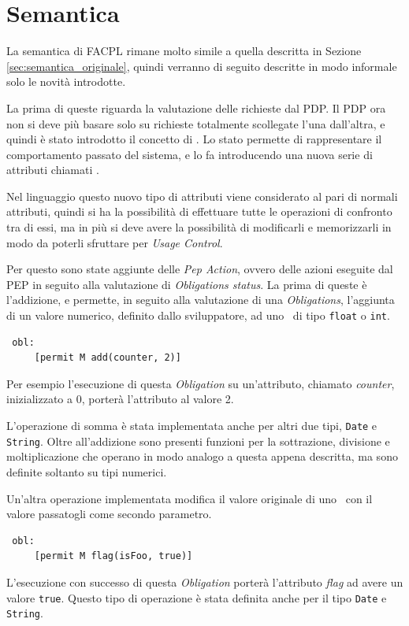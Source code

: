 
\section{Semantica} %
\label{sec:semantica}
La semantica di FACPL rimane molto simile a quella descritta in Sezione \ref{sec:semantica_originale}, quindi verranno di seguito descritte in modo informale solo le novità introdotte.\\ \par
La prima di queste riguarda la valutazione delle richieste dal PDP. Il PDP ora non si deve più basare solo su richieste totalmente scollegate l'una dall'altra, e quindi è stato introdotto il concetto di \status.
Lo stato permette di rappresentare il comportamento passato del sistema, e lo fa introducendo una nuova serie di attributi chiamati \statusattribute.\\ \par
Nel linguaggio questo nuovo tipo di attributi viene considerato al pari di normali attributi, quindi si ha la possibilità di effettuare tutte le operazioni di confronto tra di essi, ma in più si deve avere la possibilità di modificarli e memorizzarli in modo da poterli sfruttare per \textit{Usage Control}.\\ \par

Per questo sono state aggiunte delle \textit{Pep Action}, ovvero delle azioni eseguite dal PEP in seguito alla valutazione di \textit{Obligations status}. La prima di queste è l'addizione, 
 e permette, in seguito alla valutazione di una \textit{Obligations}, l'aggiunta di un valore numerico, definito dallo sviluppatore, ad uno \statusattribute \ di tipo \texttt{float} o \texttt{int}. 
\begin{verbatim}
 obl:
     [permit M add(counter, 2)]
\end{verbatim}
Per esempio l'esecuzione di questa \textit{Obligation} su un'attributo, chiamato \textit{counter}, inizializzato a $0$, porterà l'attributo al 
valore 2. 

L'operazione di somma è stata implementata anche per altri due tipi, \texttt{Date} e \texttt{String}.
Oltre all'addizione sono presenti funzioni per la sottrazione, divisione e moltiplicazione che operano in modo analogo a questa appena descritta, ma sono definite soltanto su tipi numerici.

Un'altra operazione implementata modifica il valore originale di uno \statusattribute \ con il valore passatogli come secondo parametro.
\begin{verbatim}
 obl:
     [permit M flag(isFoo, true)]
\end{verbatim}
L'esecuzione con successo di questa \textit{Obligation} porterà l'attributo \textit{flag} ad avere un valore \texttt{true}. Questo tipo di operazione è stata definita anche per il tipo \texttt{Date} e \texttt{String}.

